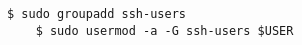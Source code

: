 \begin{lstlisting}[language=term,caption=Ändern des Passworts,label=passwd]
    $ sudo groupadd ssh-users
    $ sudo usermod -a -G ssh-users $USER
\end{lstlisting}